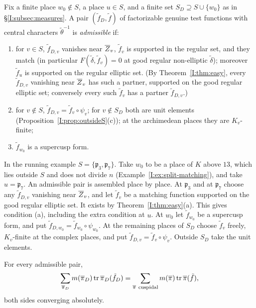 \begin{definition}\label{I:def:globalpairs}
Fix a finite place $w_0\notin S$, a place $u\in S$, and a finite set $S_D\supseteq S\cup\{w_0\}$ as in \S\ref{I:subsec:measures}. A pair $(\tilde f_D,\tilde f)$ of factorizable genuine test functions with central characters $\tilde\theta^{-1}$ is \emph{admissible} if:
\begin{enumerate}[label=(\alph*)]
\item for $v\in S$, $\tilde f_{D,v}$ vanishes near $\overline{Z}_v$, $\tilde f_v$ is supported in the regular set, and they match (in particular $F(\tilde\delta,\tilde f_v)=0$ at good regular non-elliptic $\tilde\delta$); moreover $\tilde f_u$ is supported on the regular elliptic set. (By Theorem~\ref{I:thm:easy}, every $\tilde f_{D,v}$ vanishing near $\overline{Z}_v$ has such a partner, supported on the good regular elliptic set; conversely every such $\tilde f_v$ has a partner $\tilde f_{D,v}$.)
\item for $v\notin S$, $\tilde f_{D,v}=\tilde f_v\circ\psi_v$; for $v\notin S_D$ both are unit elements (Proposition~\ref{I:prop:outsideS}(c)); at the archimedean places they are $K_v$-finite;
\item $\tilde f_{w_0}$ is a supercusp form.
\end{enumerate}
\end{definition}

\begin{example}\label{I:ex:admissible}
In the running example $S=\{\mathfrak p_3,\mathfrak p_7\}$. Take $w_0$ to be a place of $K$ above $13$, which lies outside $S$ and does not divide $n$ (Example~\ref{I:ex:split-matching}), and take $u=\mathfrak p_7$. An admissible pair is assembled place by place. At $\mathfrak p_3$ and at $\mathfrak p_7$ choose any $\tilde f_{D,v}$ vanishing near $\overline{Z}_v$, and let $\tilde f_v$ be a matching function supported on the good regular elliptic set. It exists by Theorem~\ref{I:thm:easy}(a). This gives condition (a), including the extra condition at $u$. At $w_0$ let $\tilde f_{w_0}$ be a supercusp form, and put $\tilde f_{D,w_0}=\tilde f_{w_0}\circ\psi_{w_0}$. At the remaining places of $S_D$ choose $\tilde f_v$ freely, $K_v$-finite at the complex places, and put $\tilde f_{D,v}=\tilde f_v\circ\psi_v$. Outside $S_D$ take the unit elements.
\end{example}


\begin{theorem}\label{I:thm:comparison}
For every admissible pair,
\[ \sum_{\overline{\pi}_D}m(\overline{\pi}_D)\operatorname{tr}\overline{\pi}_D(\tilde f_D)=\sum_{\overline{\pi}\ \mathrm{cuspidal}}m(\overline{\pi})\operatorname{tr}\overline{\pi}(\tilde f), \]
both sides converging absolutely.
\end{theorem}


